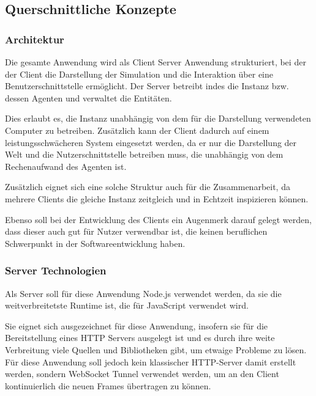 \subsection{Querschnittliche Konzepte}


\subsubsection{Architektur}

Die gesamte Anwendung wird als Client Server Anwendung strukturiert, bei der der Client die Darstellung der Simulation und die Interaktion über eine Benutzerschnittstelle ermöglicht.
Der Server betreibt indes die Instanz bzw. dessen Agenten und verwaltet die Entitäten.

Dies erlaubt es, die Instanz unabhängig von dem für die Darstellung verwendeten Computer zu betreiben.
Zusätzlich kann der Client dadurch auf einem leistungsschwächeren System eingesetzt werden, da er nur die Darstellung der Welt und die Nutzerschnittstelle betreiben muss, die unabhängig von dem Rechenaufwand des Agenten ist.

Zusätzlich eignet sich eine solche Struktur auch für die Zusammenarbeit, da mehrere Clients die gleiche Instanz zeitgleich und in Echtzeit inspizieren können.

Ebenso soll bei der Entwicklung des Clients ein Augenmerk darauf gelegt werden, dass dieser auch gut für Nutzer verwendbar ist, die keinen beruflichen Schwerpunkt in der Softwareentwicklung haben.

\subsubsection{Server Technologien}

Als Server soll für diese Anwendung Node.js verwendet werden, da sie die weitverbreitetste Runtime ist, die für JavaScript verwendet wird\autocite{stateofjsRuntimes2021}.

Sie eignet sich ausgezeichnet für diese Anwendung, insofern sie für die Bereitstellung eines HTTP Servers ausgelegt ist\autocite{nodejsabout2022} und es durch ihre weite Verbreitung viele Quellen und Bibliotheken gibt, um etwaige Probleme zu lösen.
Für diese Anwendung soll jedoch kein klassischer HTTP-Server damit erstellt werden, sondern WebSocket Tunnel verwendet werden, um an den Client kontinuierlich die neuen Frames übertragen zu können.

